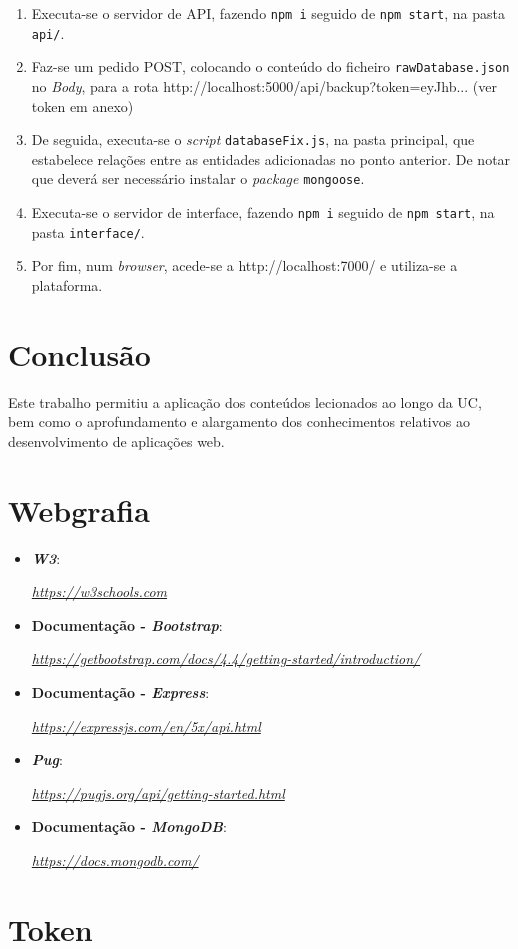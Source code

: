 \documentclass[a4paper]{report}
\begin{document}
	\begin{enumerate}
		\item Executa-se o servidor de API, fazendo \texttt{npm i} seguido de \texttt{npm start}, na pasta \texttt{api/}.
        
        \item Faz-se um pedido POST, colocando o conteúdo do ficheiro \texttt{rawDatabase.json} no \textit{Body}, para a rota http://localhost:5000/api/backup?token=eyJhb... (ver token em anexo)
        
        \item De seguida, executa-se o \textit{script} \texttt{databaseFix.js}, na pasta principal, que estabelece relações entre as entidades adicionadas no ponto anterior.
              De notar que deverá ser necessário instalar o \textit{package} \texttt{mongoose}.
		
		\item Executa-se o servidor de interface, fazendo \texttt{npm i} seguido de \texttt{npm start}, na pasta \texttt{interface/}.

        \item Por fim, num \textit{browser}, acede-se a http://localhost:7000/ e utiliza-se a plataforma.
	\end{enumerate}

\chapter{Conclusão}
Este trabalho permitiu a aplicação dos conteúdos lecionados ao longo da UC, bem como o aprofundamento e alargamento dos conhecimentos relativos ao desenvolvimento de aplicações web.


\chapter{Webgrafia}
	\begin{itemize}
		\item \textbf{\textit{W3}}:
		\par \textit{\url{https://w3schools.com}}
        \item \textbf{Documentação - \textit{Bootstrap}}:
		\par \textit{\url{https://getbootstrap.com/docs/4.4/getting-started/introduction/}}
		\item \textbf{Documentação - \textit{Express}}:
		\par \textit{\url{https://expressjs.com/en/5x/api.html}}
        \item \textbf{\textit{Pug}}:
		\par \textit{\url{https://pugjs.org/api/getting-started.html}}
        \item \textbf{Documentação - \textit{MongoDB}}:
		\par \textit{\url{https://docs.mongodb.com/}}
    \end{itemize}


\appendix
\chapter{Token}

\end{document}
